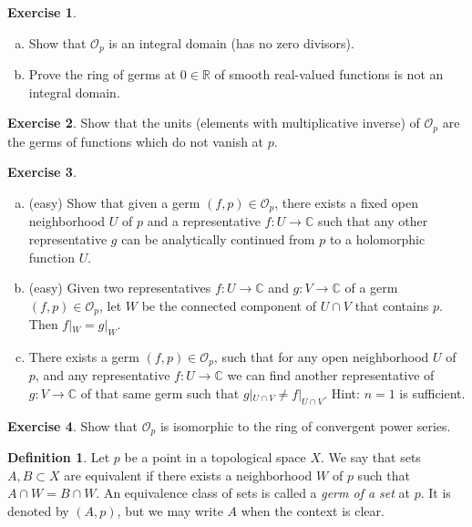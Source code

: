 \documentclass[12pt,openany]{book}
\newcommand{\C}{{\mathbb{C}}}
\newcommand{\R}{{\mathbb{R}}}
\newcommand{\sO}{{\mathscr{O}}}
\newcommand{\myindex}[1]{#1\index{#1}}
\theoremstyle{plain}
\theoremstyle{remark}
\theoremstyle{definition}
\newtheorem{defn}[thm]{Definition}
\newenvironment{exbox}{%
    \def\FrameCommand{\vrule width 1pt \relax\hspace{10pt}}%
    \MakeFramed{\advance\hsize-\width\FrameRestore}%
}{%
    \endMakeFramed
}
\newenvironment{exparts}{%
    \leavevmode\begin{enumerate}[a),noitemsep,topsep=0pt,parsep=0pt,partopsep=0pt]
}{%
    \end{enumerate}
}
\theoremstyle{exercise}
\newtheorem{exercise}{Exercise}[section]
\theoremstyle{example}
\begin{document}
\begin{exbox}
\begin{exercise}
\begin{exparts}
\item
Show that $\sO_p$ is an \myindex{integral domain} (has no zero divisors).
\item
Prove the ring of germs at $0 \in \R$ of smooth real-valued functions
is not an integral domain.
\end{exparts}
\end{exercise}

\begin{exercise}
Show that the units (elements with multiplicative inverse)
of $\sO_p$ are the germs of functions which do not vanish at
$p$.
\end{exercise}

\begin{exercise}
\begin{exparts}
\item (easy)
Show that given a germ $(f,p) \in \sO_p$,
there exists a fixed open neighborhood $U$
of $p$ and a representative $f \colon U \to \C$ such that any other
representative $g$ can be analytically continued from $p$ to a holomorphic
function $U$.
\item
(easy) Given two representatives $f \colon U \to \C$
and $g \colon V \to \C$ of a germ $(f,p) \in \sO_p$,
let $W$ be the connected component of $U \cap V$
that contains $p$.  Then $f|_W = g|_W$.
\item
There exists a germ $(f,p) \in \sO_p$, such that for
any open neighborhood $U$ of $p$, and
any representative $f \colon U \to \C$ we can
find another representative of $g \colon V \to \C$
of that same germ such that $g|_{U \cap V} \not= f|_{U \cap V}$.
Hint: $n=1$ is sufficient.
\end{exparts}
\end{exercise}

\begin{exercise}
Show that $\sO_p$ is isomorphic to the ring of convergent power series.
\end{exercise}
\end{exbox}


\begin{defn}
Let $p$ be a point in a topological space $X$.
We say that sets $A, B \subset X$ are equivalent
if there exists a neighborhood $W$ of $p$
such that $A \cap W = B \cap W$.
An equivalence class of sets 
is called a \emph{\myindex{germ of a set}} at $p$.
%
It is denoted by $(A,p)$, but we may write $A$ when
the context is clear.
\end{defn}
\end{document}
